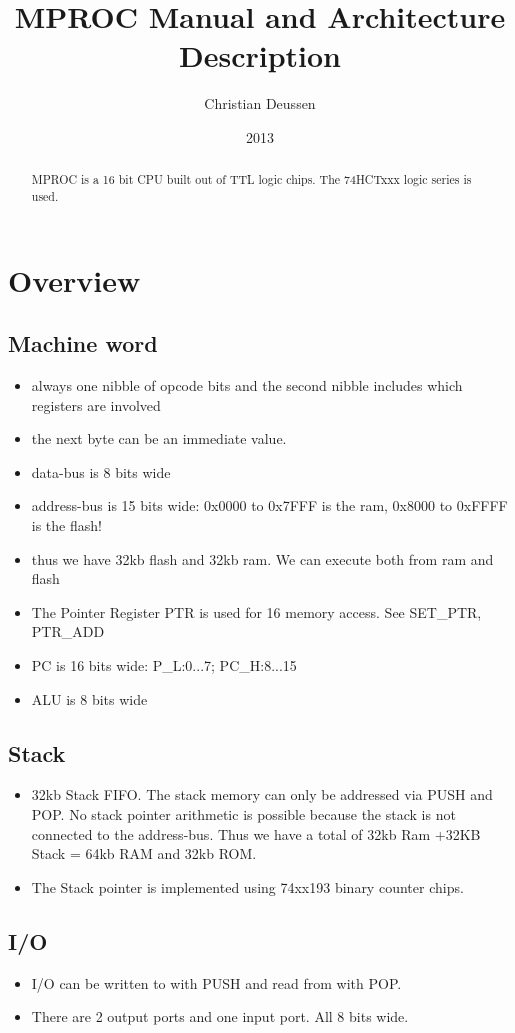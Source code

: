\documentclass[a4paper, 12pt]{article}
\title{MPROC Manual and Architecture Description}
\author{Christian Deussen}
\date{2013}
\begin{document}
	\maketitle
	\begin{abstract}
		MPROC is a 16 bit CPU built out of TTL logic chips. The 74HCTxxx logic series is used.
	\end{abstract}
	\tableofcontents
	\newpage
	\section{Overview}
	\subsection {Machine word}
	\begin{itemize}
		\item always one nibble of opcode bits and the second nibble includes which registers are involved
		\item the next byte can be an immediate value.
		\item data-bus is 8 bits wide
		\item address-bus is 15 bits wide: 0x0000 to 0x7FFF is the ram, 0x8000 to 0xFFFF is the flash! 
		\item thus we have 32kb flash and 32kb ram. We can execute both from ram and flash
		\item The Pointer Register PTR is used for 16 memory access. See SET\_PTR, PTR\_ADD
		\item PC is 16 bits wide: P\_L:0...7; PC\_H:8...15
		\item ALU is 8 bits wide
	\end{itemize}

	\subsection {Stack}
	\begin{itemize}
		\item 32kb Stack FIFO. The stack memory can only be addressed via PUSH and POP. No stack pointer arithmetic is possible because the stack is not connected to the address-bus. Thus we have a total of 32kb Ram +32KB Stack = 64kb RAM and 32kb ROM.
		\item The Stack pointer is implemented using 74xx193 binary counter chips. 
	\end{itemize}

	\subsection{I/O}
	\begin{itemize}
		\item I/O can be written to with PUSH and read from with POP. 
		\item There are 2 output ports and one input port. All 8 bits wide.
	\end{itemize}
\end{document}
